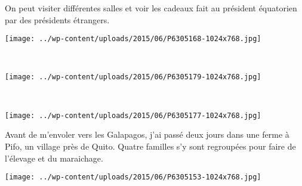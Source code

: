 On peut visiter différentes salles et voir les cadeaux fait au président équatorien par des présidents étrangers. 
\begin{center} 
\texttt{[image: ../wp-content/uploads/2015/06/P6305168-1024x768.jpg]} 
\end{center}
\vspace{-\topsep}
\pagebreak
~
\begin{center} 
\texttt{[image: ../wp-content/uploads/2015/06/P6305179-1024x768.jpg]} 
\end{center}
~\\
\begin{center} 
\texttt{[image: ../wp-content/uploads/2015/06/P6305177-1024x768.jpg]} 
\end{center}
\vspace{-\topsep}
\pagebreak

Avant de m'envoler vers les Galapagos, j'ai passé deux jours dans une ferme à Pifo, un village près de Quito. Quatre familles s'y sont regroupées pour faire de l'élevage et du maraichage.
\begin{center} 
\texttt{[image: ../wp-content/uploads/2015/06/P6305153-1024x768.jpg]} 
\end{center}
